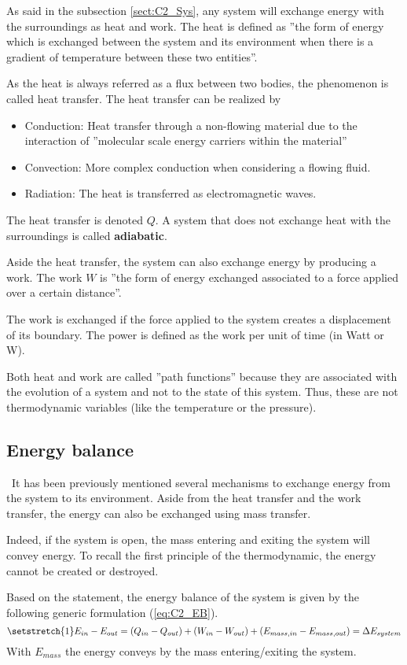 As said in the subsection \ref{sect:C2_Sys}, any system will exchange energy with the surroundings as heat and work. The heat is defined as ''the form of energy which is exchanged between the system and its environment when there is a gradient of temperature between these two entities''. 

As the heat is always referred as a flux between two bodies, the phenomenon is called heat transfer. The heat transfer can be realized by
\begin{itemize}
    \item Conduction: Heat transfer through a non-flowing material due to the interaction of ''molecular scale energy carriers within the material''\cite{GregoryNellis2015}
    \item Convection: More complex conduction when considering a flowing fluid.
    \item Radiation: The heat is transferred as electromagnetic waves.
\end{itemize}
The heat transfer is denoted $Q$. A system that does not exchange heat with the surroundings is called \textbf{adiabatic}.

Aside the heat transfer, the system can also exchange energy by producing a work. The work $W$ is ''the form of energy exchanged associated to a force applied over a certain distance''. 

The work is exchanged if the force applied to the system creates a displacement of its boundary. The power is defined as the work per unit of time (in Watt or W).

Both heat and work are called ''path functions'' because they are associated with the evolution of a system and not to the state of this system. Thus, these are not thermodynamic variables (like the temperature or the pressure).
\subsection{Energy balance}
\quad\, It has been previously mentioned several mechanisms to exchange energy from the system to its environment. Aside from the heat transfer and the work transfer, the energy can also be exchanged using mass transfer. 

Indeed, if the system is open, the mass entering and exiting the system will convey energy. To recall the first principle of the thermodynamic, the energy cannot be created or destroyed. 

Based on the statement, the energy balance of the system is given by the following generic formulation (\ref{eq:C2_EB}).
\begin{equation}
\setstretch{1}
    E_{in} - E_{out} = (Q_{in} - Q_{out}) + (W_{in} - W_{out}) + (E_{mass,in} - E_{mass,out}) = \Delta E_{system} \label{eq:C2_EB}
\end{equation}
With $E_{mass}$ the energy conveys by the mass entering/exiting the system.

